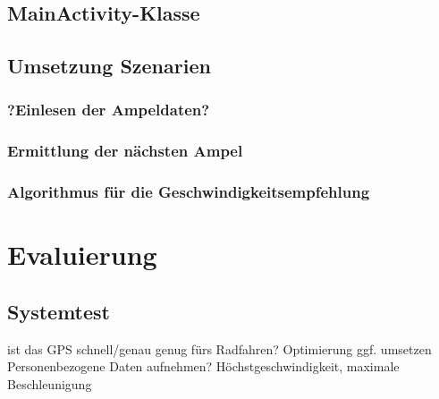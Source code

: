 \section{MainActivity-Klasse}
\section{Umsetzung Szenarien}
\subsection{?Einlesen der Ampeldaten?}
\subsection{Ermittlung der nächsten Ampel}
\subsection{Algorithmus für die Geschwindigkeitsempfehlung}

%
%
\chapter{Evaluierung}
\section{Systemtest}
ist das GPS schnell/genau genug fürs Radfahren?
Optimierung ggf. umsetzen\\
Personenbezogene Daten aufnehmen? Höchstgeschwindigkeit, maximale Beschleunigung
